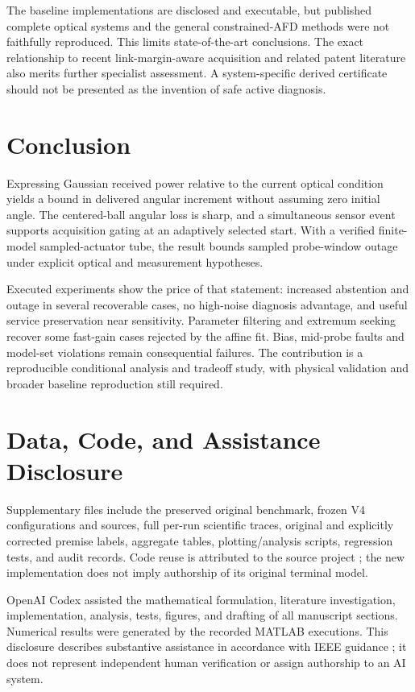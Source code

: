 \documentclass[10pt,journal]{IEEEtran}
\begin{document}
The baseline implementations are disclosed and executable, but published complete optical systems and the general constrained-AFD methods were not faithfully reproduced. This limits state-of-the-art conclusions. The exact relationship to recent link-margin-aware acquisition and related patent literature also merits further specialist assessment. A system-specific derived certificate should not be presented as the invention of safe active diagnosis.

\balance
\section{Conclusion}
Expressing Gaussian received power relative to the current optical condition yields a bound in delivered angular increment without assuming zero initial angle. The centered-ball angular loss is sharp, and a simultaneous sensor event supports acquisition gating at an adaptively selected start. With a verified finite-model sampled-actuator tube, the result bounds sampled probe-window outage under explicit optical and measurement hypotheses.

Executed experiments show the price of that statement: increased abstention and outage in several recoverable cases, no high-noise diagnosis advantage, and useful service preservation near sensitivity. Parameter filtering and extremum seeking recover some fast-gain cases rejected by the affine fit. Bias, mid-probe faults and model-set violations remain consequential failures. The contribution is a reproducible conditional analysis and tradeoff study, with physical validation and broader baseline reproduction still required.

\section*{Data, Code, and Assistance Disclosure}
Supplementary files include the preserved original benchmark, frozen V4 configurations and sources, full per-run scientific traces, original and explicitly corrected premise labels, aggregate tables, plotting/analysis scripts, regression tests, and audit records. Code reuse is attributed to the source project \cite{source}; the new implementation does not imply authorship of its original terminal model.

OpenAI Codex assisted the mathematical formulation, literature investigation, implementation, analysis, tests, figures, and drafting of all manuscript sections. Numerical results were generated by the recorded MATLAB executions. This disclosure describes substantive assistance in accordance with IEEE guidance \cite{aipolicy}; it does not represent independent human verification or assign authorship to an AI system.


\end{document}
